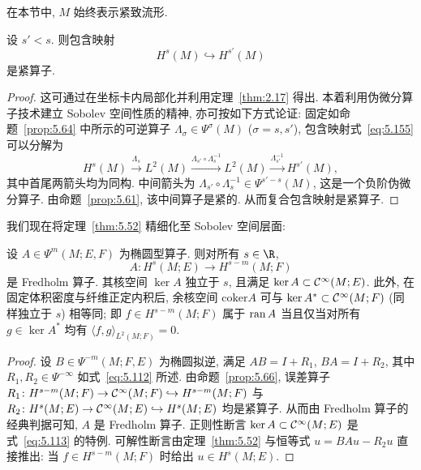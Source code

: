 在本节中, $M$ 始终表示紧致流形.

\begin{proposition}\label{prop:5.66}
设 $s' < s$. 则包含映射
\begin{equation}\label{eq:5.155}
    H^s(M) \hookrightarrow H^{s'}(M)
\end{equation}
是紧算子.
\end{proposition}

\begin{proof}
这可通过在坐标卡内局部化并利用定理~\ref{thm:2.17} 得出. 本着利用伪微分算子技术建立 Sobolev 空间性质的精神, 亦可按如下方式论证: 固定如命题~\ref{prop:5.64} 中所示的可逆算子 $\Lambda_\sigma \in \Psi^\sigma(M)$ ($\sigma = s, s'$), 包含映射式~\eqref{eq:5.155} 可以分解为
\begin{equation}\label{eq:5.156}
    H^s(M) \xrightarrow{\Lambda_s} L^2(M) \xrightarrow{\Lambda_{s'} \circ \Lambda_s^{-1}} L^2(M) \xrightarrow{\Lambda_{s'}^{-1}} H^{s'}(M),
\end{equation}
其中首尾两箭头均为同构. 中间箭头为 $\Lambda_{s'} \circ \Lambda_s^{-1} \in \Psi^{s'-s}(M)$, 这是一个负阶伪微分算子. 由命题~\ref{prop:5.61}, 该中间算子是紧的. 从而复合包含映射是紧算子.
\end{proof}

我们现在将定理~\ref{thm:5.52} 精细化至 Sobolev 空间层面:

\begin{theorem}\label{thm:5.67}
设 $A \in \Psi^m(M; E, F)$ 为椭圆型算子. 则对所有 $s \in \R$,
\begin{equation}\label{eq:5.157}
    A \colon H^s(M; E) \to H^{s-m}(M; F)
\end{equation}
是 Fredholm 算子. 其核空间 $\ker A$ 独立于 $s$, 且满足 $\ker A \subset \mathcal{C}^\infty(M; E)$. 此外, 在固定体积密度与纤维正定内积后, 余核空间 $\mathrm{coker} A$ 可与 $\ker A^* \subset \mathcal{C}^\infty(M; F)$ (同样独立于 $s$) 相等同; 即 $f \in H^{s-m}(M; F)$ 属于 $\operatorname{ran} A$ 当且仅当对所有 $g \in \ker A^*$ 均有 $\langle f, g \rangle_{L^2(M; F)} = 0$.
\end{theorem}

\begin{proof}
设 $B \in \Psi^{-m}(M; F, E)$ 为椭圆拟逆, 满足 $A B = I + R_1$, $B A = I + R_2$, 其中 $R_1, R_2 \in \Psi^{-\infty}$ 如式~\eqref{eq:5.112} 所述. 由命题~\ref{prop:5.66}, 误差算子 $R_1 \colon H^{s-m}(M; F) \to \mathcal{C}^\infty(M; F) \hookrightarrow H^{s-m}(M; F)$ 与 $R_2 \colon H^s(M; E) \to \mathcal{C}^\infty(M; E) \hookrightarrow H^s(M; E)$ 均是紧算子. 从而由 Fredholm 算子的经典判据可知, $A$ 是 Fredholm 算子. 正则性断言 $\ker A \subset \mathcal{C}^\infty(M; E)$ 是式~\eqref{eq:5.113} 的特例. 可解性断言由定理~\ref{thm:5.52} 与恒等式 $u = B A u - R_2 u$ 直接推出: 当 $f \in H^{s-m}(M; F)$ 时给出 $u \in H^s(M; E)$.
\end{proof}

